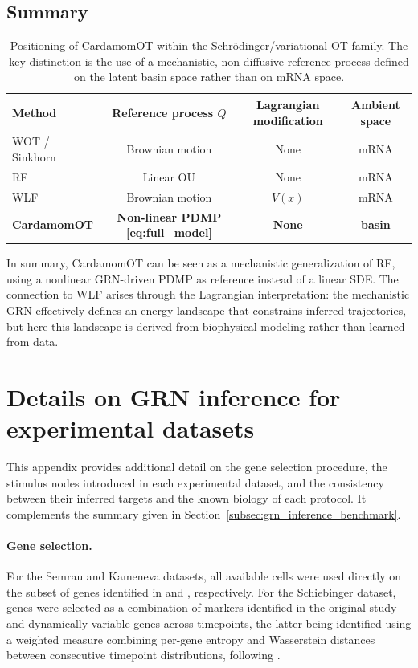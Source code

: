 \documentclass[a4paper, 11pt]{article}
\theoremstyle{plain}
\theoremstyle{remark}
\newcommand*{\firstreview}[1]{{\color{black}#1}}
\begin{document}
\begin{appendices}
\subsection{Summary}

\begin{table}[h]
\centering
\begin{tabular}{lccc}
\toprule
Method & Reference process $Q$ & Lagrangian modification & Ambient space \\
\midrule
WOT / Sinkhorn~\cite{schiebinger2019optimal} & Brownian motion & None & mRNA \\
\firstreview{RF}~\cite{zhang2024joint} & Linear OU & None & mRNA \\
WLF~\cite{neklyudov2023computational} & Brownian motion & $V(x)$ & mRNA \\
\textbf{CardamomOT} & \textbf{Non-linear PDMP \eqref{eq:full_model}} & \textbf{None} & \textbf{basin} \\
\bottomrule
\end{tabular}
\caption{Positioning of CardamomOT within the Schrödinger/variational OT family. The key distinction is the use of a mechanistic, non-diffusive reference process defined on the latent basin space rather than on mRNA space.}
\label{tab:schrodinger}
\end{table}

In summary, CardamomOT can be seen as a mechanistic generalization of \firstreview{RF}, using a nonlinear GRN-driven PDMP as reference instead of a linear SDE. The connection to WLF arises through the Lagrangian interpretation: the mechanistic GRN effectively defines an energy landscape that constrains inferred trajectories, but here this landscape is derived from biophysical modeling rather than learned from data.


\section{Details on GRN inference for experimental datasets}
\label{supp_experimental}

This appendix provides additional detail on the gene selection procedure, the 
stimulus nodes introduced in each experimental dataset, and the consistency 
between their inferred targets and the known biology of each protocol. It 
complements the summary given in Section~\ref{subsec:grn_inference_benchmark}.

\paragraph{Gene selection.} For the Semrau and Kameneva datasets, all available 
cells were used directly on the subset of genes identified in 
\cite{ventre2023one} and \cite{gandrillon2025inferring}, respectively. For the 
Schiebinger dataset, genes were selected as a combination of markers identified 
in the original study \cite{schiebinger2019optimal} and dynamically variable 
genes across timepoints, the latter being identified using a weighted measure 
combining per-gene entropy and Wasserstein distances between consecutive 
timepoint distributions, following \cite{gandrillon2025inferring}.


\end{appendices}
\end{document}
